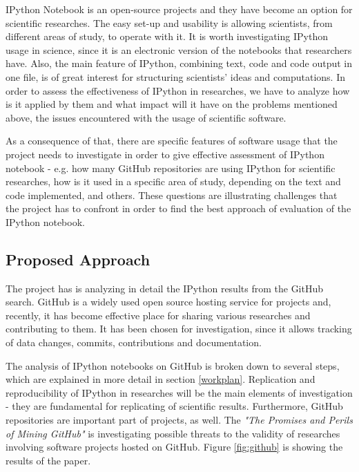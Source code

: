 IPython Notebook is an open-source projects and they have become an option for scientific researches. The easy set-up and usability is allowing scientists, from different areas of study, to operate with it. It is worth investigating IPython usage in science, since it is an electronic version of the notebooks that researchers have. Also, the main feature of IPython, combining text, code and code output in one file, is of great interest for structuring scientists' ideas and computations. In order to assess the effectiveness of IPython in researches, we have to analyze how is it applied by them and what impact will it have on the problems mentioned above, the issues encountered with the usage of scientific software. 

As a consequence of that, there are specific features of software usage that the project needs to investigate in order to give effective assessment of IPython notebook - e.g. how many GitHub repositories are using IPython for scientific researches, how is it used in a specific area of study, depending on the text and code implemented, and others. These questions are illustrating challenges that the project has to confront in order to find the best approach of evaluation of the IPython notebook.  

\subsection{Proposed Approach}

The project has is analyzing in detail the IPython results from the GitHub search. GitHub is a widely used open source hosting service for projects and, recently, it has become effective place for sharing various researches and contributing to them. It has been chosen for investigation, since it allows tracking of data changes, commits, contributions and documentation. 

The analysis of IPython notebooks on GitHub is broken down to several steps, which are explained in more detail in section \ref{workplan}. Replication and reproducibility of IPython in researches will be the main elements of investigation - they are fundamental for replicating of scientific results. Furthermore, GitHub repositories are important part of projects, as well. The \textit{"The Promises and Perils of Mining GitHub"} is investigating possible threats to the validity of researches involving software projects hosted on GitHub.\cite{kalliamvakoupromises} Figure \ref{fig:github} is showing the results of the paper. 


